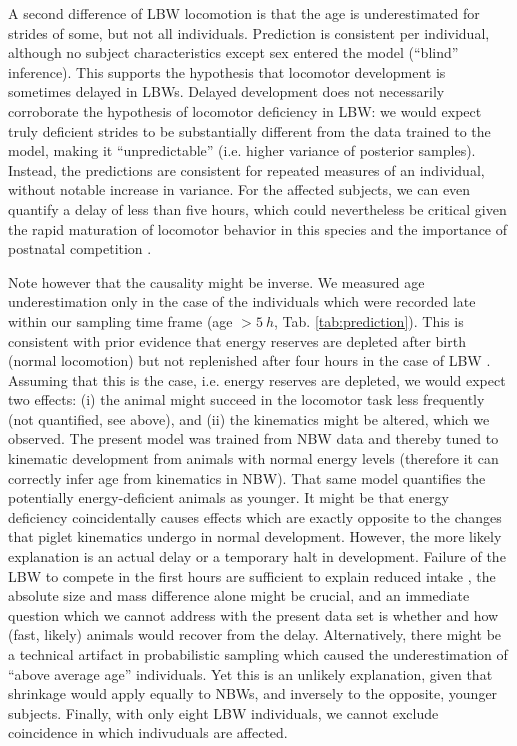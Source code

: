 A second difference of LBW locomotion is that the age is underestimated for strides of some, but not all individuals.
Prediction is consistent per individual, although no subject characteristics except sex entered the model (``blind'' inference).
This supports the hypothesis that locomotor development is sometimes delayed in LBWs.
Delayed development does not necessarily corroborate the hypothesis of locomotor deficiency in LBW: we would expect truly deficient strides to be substantially different from the data trained to the model, making it ``unpredictable'' (i.e. higher variance of posterior samples).
Instead, the predictions are consistent for repeated measures of an individual, without notable increase in variance.
For the affected subjects, we can even quantify a delay of less than five hours, which could nevertheless be critical given the rapid maturation of locomotor behavior in this species \citep{VandenHole2017} and the importance of postnatal competition \citep{Litten2003}.


Note however that the causality might be inverse.
We measured age underestimation only in the case of the individuals which were recorded late within our sampling time frame (age \(> 5\ h\), Tab. \ref{tab:prediction}).
This is consistent with prior evidence that energy reserves are depleted after birth (normal locomotion) but not replenished after four hours in the case of LBW \citep{LeDividich2017,VandenHole2019}.
Assuming that this is the case, i.e. energy reserves are depleted, we would expect two effects: (i) the animal might succeed in the locomotor task less frequently (not quantified, see above), and (ii) the kinematics might be altered, which we observed.
The present model was trained from NBW data and thereby tuned to kinematic development from animals with normal energy levels (therefore it can correctly infer age from kinematics in NBW).
That same model quantifies the potentially energy-deficient animals as younger.
It might be that energy deficiency coincidentally causes effects which are exactly opposite to the changes that piglet kinematics undergo in normal development.
However, the more likely explanation is an actual delay or a temporary halt in development.
Failure of the LBW to compete in the first hours are sufficient to explain reduced intake \citep{Amdi2013}, the absolute size and mass difference alone might be crucial, and an immediate question which we cannot address with the present data set is whether and how (fast, likely) animals would recover from the delay.
Alternatively, there might be a technical artifact in probabilistic sampling \citep["shrinkage", \textit{cf.}][]{Gelman2013} which caused the underestimation of ``above average age'' individuals.
Yet this is an unlikely explanation, given that shrinkage would apply equally to NBWs, and inversely to the opposite, younger subjects.
Finally, with only eight LBW individuals, we cannot exclude coincidence in which indivuduals are affected.

